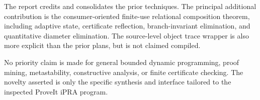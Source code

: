 The report credits and consolidates the prior techniques.  The principal additional contribution is the consumer-oriented finite-use relational composition theorem, including adaptive state, certificate reflection, branch-invariant elimination, and quantitative diameter elimination.  The source-level object trace wrapper is also more explicit than the prior plans, but is not claimed compiled.

No priority claim is made for general bounded dynamic programming, proof mining, metastability, constructive analysis, or finite certificate checking.  The novelty asserted is only the specific synthesis and interface tailored to the inspected ProveIt iPRA program.
